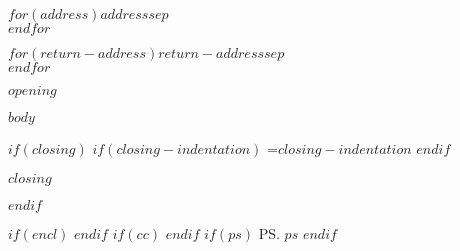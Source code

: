 \documentclass{letter}
\date{$date$}
\begin{document}
\begin{letter}{$for(address)$$address$$sep$\\$endfor$}


\begin{flushright}
$for(return-address)$$return-address$$sep$\\$endfor$
\end{flushright}

\opening{$opening$}

$body$

$if(closing)$
$if(closing-indentation)$
\longindentation=$closing-indentation$
$endif$
\closing{$closing$}
$endif$

\vfill

$if(encl)$
$endif$
$if(cc)$
$endif$
$if(ps)$
\ps{$ps$}
$endif$

\end{letter}
\end{document}
